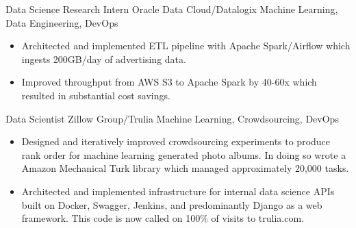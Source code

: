 \documentclass[11pt,a4paper,sans]{moderncv} %
\begin{document}
		{Data Science Research Intern}
		{Oracle Data Cloud/Datalogix}
		{Machine Learning, Data Engineering, DevOps}
		{}
		{
			\begin{itemize}
			\item Architected and implemented ETL pipeline with Apache Spark/Airflow which ingests 200GB/day of advertising data.
			\item Improved throughput from AWS S3 to Apache Spark by 40-60x which resulted in substantial cost savings.
			\end{itemize}
		}

		{Data Scientist}
		{Zillow Group/Trulia}
		{Machine Learning, Crowdsourcing, DevOps}
		{}
		{
			\begin{itemize}
				\item Designed and iteratively improved crowdsourcing experiments to produce rank order for machine learning generated photo albums. In doing so wrote a Amazon Mechanical Turk library which managed approximately 20,000 tasks.
				\item Architected and implemented infrastructure for internal data science APIs built on Docker, Swagger, Jenkins, and predominantly Django as a web framework. This code is now called on 100\% of visits to trulia.com.
			\end{itemize}
		}
\end{document}
